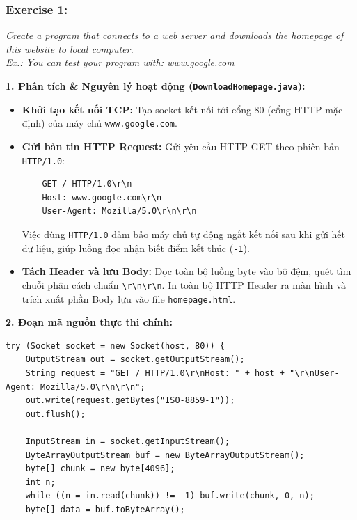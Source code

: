 \documentclass[11pt,a4paper]{article}
\begin{document}
\subsubsection*{Exercise 1:}
\noindent\textit{Create a program that connects to a web server and downloads the homepage of this website to local computer.\\
Ex.: You can test your program with: www.google.com}

\begin{solutionbox}[title=Báo cáo \& Bài làm: Exercise 1 -- Tải Trang chủ Web]
\textbf{1. Phân tích \& Nguyên lý hoạt động (\texttt{DownloadHomepage.java}):}
\begin{itemize}
    \item \textbf{Khởi tạo kết nối TCP:} Tạo socket kết nối tới cổng 80 (cổng HTTP mặc định) của máy chủ \texttt{www.google.com}.
    \vspace{-0.2cm}
    \item \textbf{Gửi bản tin HTTP Request:} Gửi yêu cầu HTTP GET theo phiên bản \texttt{HTTP/1.0}:

    \vspace{-0.4cm}
    \begin{verbatim}
    GET / HTTP/1.0\r\n
    Host: www.google.com\r\n
    User-Agent: Mozilla/5.0\r\n\r\n
    \end{verbatim}
    \vspace{-0.8cm}
    
    Việc dùng \texttt{HTTP/1.0} đảm bảo máy chủ tự động ngắt kết nối sau khi gửi hết dữ liệu, giúp luồng đọc nhận biết điểm kết thúc (\texttt{-1}).
    \vspace{-0.2cm}
    \item \textbf{Tách Header và lưu Body:} Đọc toàn bộ luồng byte vào bộ đệm, quét tìm chuỗi phân cách chuẩn \texttt{\textbackslash r\textbackslash n\textbackslash r\textbackslash n}. In toàn bộ HTTP Header ra màn hình và trích xuất phần Body lưu vào file \texttt{homepage.html}.
\end{itemize}

\textbf{2. Đoạn mã nguồn thực thi chính:}
\begin{lstlisting}
try (Socket socket = new Socket(host, 80)) {
    OutputStream out = socket.getOutputStream();
    String request = "GET / HTTP/1.0\r\nHost: " + host + "\r\nUser-Agent: Mozilla/5.0\r\n\r\n";
    out.write(request.getBytes("ISO-8859-1"));
    out.flush();

    InputStream in = socket.getInputStream();
    ByteArrayOutputStream buf = new ByteArrayOutputStream();
    byte[] chunk = new byte[4096];
    int n;
    while ((n = in.read(chunk)) != -1) buf.write(chunk, 0, n);
    byte[] data = buf.toByteArray();


\end{lstlisting}
\end{solutionbox}
\end{document}

